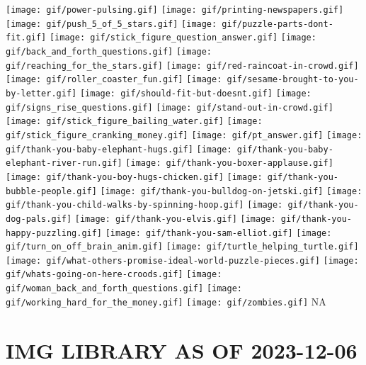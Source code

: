 \documentclass[
]{book}
\begin{document}
\texttt{[image: gif/power-pulsing.gif]}
\texttt{[image: gif/printing-newspapers.gif]}
\texttt{[image: gif/push\_5\_of\_5\_stars.gif]}
\texttt{[image: gif/puzzle-parts-dont-fit.gif]}
\texttt{[image: gif/stick\_figure\_question\_answer.gif]}
\texttt{[image: gif/back\_and\_forth\_questions.gif]}
\texttt{[image: gif/reaching\_for\_the\_stars.gif]}
\texttt{[image: gif/red-raincoat-in-crowd.gif]}
\texttt{[image: gif/roller\_coaster\_fun.gif]}
\texttt{[image: gif/sesame-brought-to-you-by-letter.gif]}
\texttt{[image: gif/should-fit-but-doesnt.gif]}
\texttt{[image: gif/signs\_rise\_questions.gif]}
\texttt{[image: gif/stand-out-in-crowd.gif]}
\texttt{[image: gif/stick\_figure\_bailing\_water.gif]}
\texttt{[image: gif/stick\_figure\_cranking\_money.gif]}
\texttt{[image: gif/pt\_answer.gif]}
\texttt{[image: gif/thank-you-baby-elephant-hugs.gif]}
\texttt{[image: gif/thank-you-baby-elephant-river-run.gif]}
\texttt{[image: gif/thank-you-boxer-applause.gif]}
\texttt{[image: gif/thank-you-boy-hugs-chicken.gif]}
\texttt{[image: gif/thank-you-bubble-people.gif]}
\texttt{[image: gif/thank-you-bulldog-on-jetski.gif]}
\texttt{[image: gif/thank-you-child-walks-by-spinning-hoop.gif]}
\texttt{[image: gif/thank-you-dog-pals.gif]}
\texttt{[image: gif/thank-you-elvis.gif]}
\texttt{[image: gif/thank-you-happy-puzzling.gif]}
\texttt{[image: gif/thank-you-sam-elliot.gif]}
\texttt{[image: gif/turn\_on\_off\_brain\_anim.gif]}
\texttt{[image: gif/turtle\_helping\_turtle.gif]}
\texttt{[image: gif/what-others-promise-ideal-world-puzzle-pieces.gif]}
\texttt{[image: gif/whats-going-on-here-croods.gif]}
\texttt{[image: gif/woman\_back\_and\_forth\_questions.gif]}
\texttt{[image: gif/working\_hard\_for\_the\_money.gif]}
\texttt{[image: gif/zombies.gif]}
NA

\hypertarget{img-library-as-of-2023-12-06}{%
\chapter{IMG LIBRARY AS OF 2023-12-06}\label{img-library-as-of-2023-12-06}}
\end{document}
